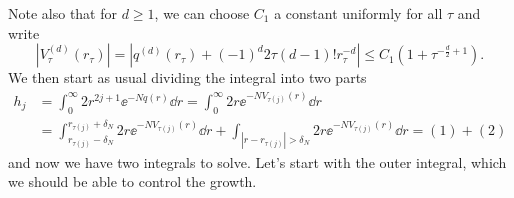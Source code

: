 Note also that for $d \geq 1$, we can choose $C_1$ a constant uniformly for all $\tau$ and write
\begin{equation}
	|V^{(d)}_\tau(r_\tau)| = |q^{(d)}(r_\tau) + (-1)^{d} 2 \tau (d-1)! r_\tau^{-d} | \leq C_1 (1 + \tau^{-\frac{d}{2} + 1}).
\end{equation} 
We then start as usual dividing the integral into two parts
\begin{align}
	h_j & = \int_{0}^{\infty} 2 r^{2j + 1} \ee^{-N q(r)} \dd r = \int_{0}^{\infty} 2 r \ee^{-N V_{\tau(j)} (r)} \dd r \\
	&= \int_{r_{\tau(j)} - \delta_N}^{r_{\tau(j)} + \delta_N} 2 r \ee^{-N V_{\tau(j)}(r)} \dd r+ \int_{|r - r_{\tau(j)}| > \delta_N} 2 r \ee^{-NV_{\tau(j)}(r)} \dd r = (1) + (2)
\end{align}
and now we have two integrals to solve. Let's start with the outer integral, which we should be able to control the growth. 

